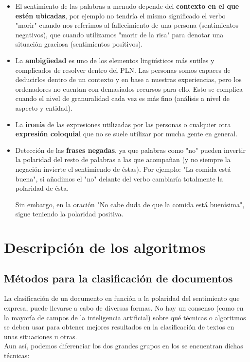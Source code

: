 \documentclass[a4paper,12pt]{report}
\begin{document}
\begin{itemize}
\item El sentimiento de las palabras a menudo depende del \textbf{contexto en el que estén ubicadas}, por ejemplo no tendría el mismo significado el verbo "morir" cuando nos referimos al fallecimiento de una persona (sentimientos negativos), que cuando utilizamos "morir de la risa" para denotar una situación graciosa (sentimientos positivos).

\item La \textbf{ambigüedad} es uno de los elementos lingüísticos más sutiles y complicados de resolver dentro del PLN. Las personas somos capaces de deducirlos dentro de un contexto y en base a nuestras experiencias, pero los ordenadores no cuentan con demasiados recursos para ello. Esto se complica cuando el nivel de granuralidad cada vez es más fino (análisis a nivel de aspecto y entidad).

\item  La \textbf{ironía} de las expresiones utilizadas por las personas o cualquier otra \textbf{expresión coloquial} que no se suele utilizar por mucha gente en general. 

\item Detección de las \textbf{frases negadas}, ya que palabras como "no" pueden invertir la polaridad del resto de palabras a las que acompañan (y no siempre la negación invierte el sentimiendo de éstas). Por ejemplo: "La comida está buena", si añadimos el "no" delante del verbo cambiaría totalmente la polaridad de ésta. 

Sin embargo, en la oración "No cabe duda de que la comida está buenísima", sigue teniendo la polaridad positiva.

\end{itemize}





\chapter{Descripción de los algoritmos}

\section{Métodos para la clasificación de documentos}

{\setlength{\parindent}{0cm}
La clasificación de un documento en función a la polaridad del sentimiento que expresa, puede llevarse a cabo de diversas formas. No hay un consenso (como en la mayoría de campos de la inteligencia artificial) sobre qué técnicas o algoritmos se deben usar para obtener mejores resultados en la clasificación de textos en unas situaciones u otras. }
\vspace{2mm}\\
Aun así, podemos diferenciar los dos grandes grupos en los se encuentran dichas técnicas:
\end{document}
